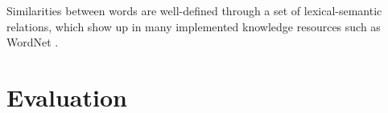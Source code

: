 Similarities between words are well-defined through a set of lexical-semantic relations, which show up in many implemented knowledge resources such as WordNet \cite{}. 




\section{Evaluation}









